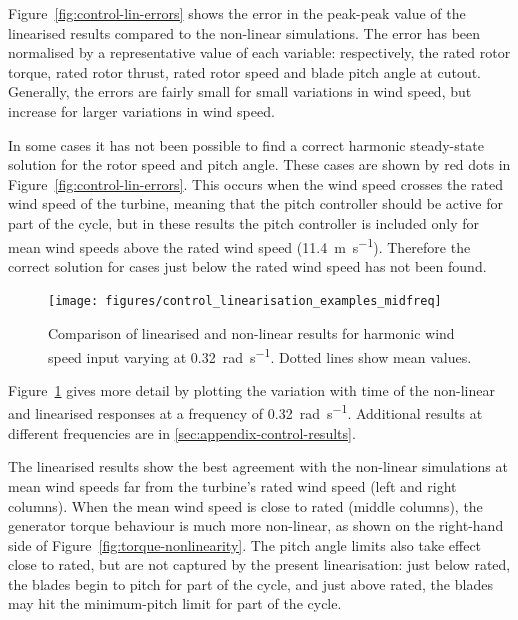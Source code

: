 \documentclass[a4paper,preprint]{elsarticle}
\begin{document}
Figure~\ref{fig:control-lin-errors} shows the error in the peak-peak value of
the linearised results compared to the non-linear simulations. The error has been
normalised by a representative value of each variable: respectively, the rated
rotor torque, rated rotor thrust, rated rotor speed and blade pitch angle at
cutout. Generally, the errors are fairly small for small variations in wind
speed, but increase for larger variations in wind speed.

In some cases it has not been possible to find a correct harmonic steady-state
solution for the rotor speed and pitch angle. These cases are shown by red dots
in Figure~\ref{fig:control-lin-errors}. This occurs when the wind speed crosses
the rated wind speed of the turbine, meaning that the pitch controller should be
active for part of the cycle, but in these results the pitch controller is
included only for mean wind speeds above the rated wind speed
(\SI{11.4}{\metre\per\second}). Therefore the correct solution for cases just
below the rated wind speed has not been found.


\begin{figure}
  \centering
  \hspace*{-1cm}\texttt{[image: figures/control\_linearisation\_examples\_midfreq]}
  \caption{Comparison of linearised and non-linear results for harmonic
    wind speed input varying at \SI{0.32}{\radian\per\second}. Dotted
    lines show mean values.}
\label{fig:control-lin-midfreq}
\end{figure}

Figure~\ref{fig:control-lin-midfreq} gives more detail by plotting the variation
with time of the non-linear and linearised responses at a frequency of
\SI{0.32}{\radian\per\second}. Additional results at different frequencies are
in \ref{sec:appendix-control-results}.

The linearised results show the best agreement with the non-linear simulations at
mean wind speeds far from the turbine's rated wind speed (left and right
columns). When the mean wind speed is close to rated (middle columns), the
generator torque behaviour is much more non-linear, as shown on the right-hand
side of Figure~\ref{fig:torque-nonlinearity}. The pitch angle limits also take
effect close to rated, but are not captured by the present linearisation: just
below rated, the blades begin to pitch for part of the cycle, and just above
rated, the blades may hit the minimum-pitch limit for part of the cycle.
\end{document}
